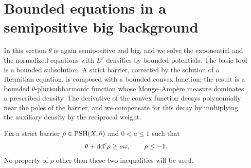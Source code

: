 \section{Bounded equations in a semipositive big background}

In this section $\theta$ is again semipositive and big, and we solve the exponential and the normalized equations with $L^p$ densities by bounded potentials. The basic tool is a bounded subsolution. A strict barrier, corrected by the solution of a Hermitian equation, is composed with a bounded convex function; the result is a bounded $\theta$-plurisubharmonic function whose Monge--Amp\`ere measure dominates a prescribed density. The derivative of the convex function decays polynomially near the poles of the barrier, and we compensate for this decay by multiplying the auxiliary density by the reciprocal weight.

Fix a strict barrier $\rho\in\mathrm{PSH}(X,\theta)$ and $0<a\leq1$ such that
\[
 \theta+\mathrm{dd}^{\mathrm{c}}\rho\geq a\omega,\qquad \rho\leq-1.
\]
No property of $\rho$ other than these two inequalities will be used.

